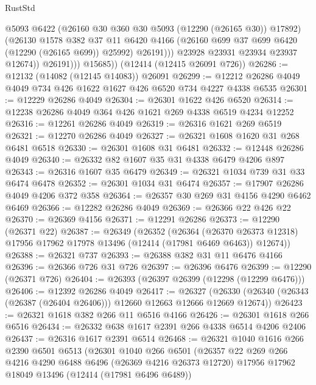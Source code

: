 \begin{lexlean}{RustStd}
\begin{coremodule}
                      @5093
                      @6422
                      (@26160 @30 @360 @30 @5093 (@12290 (@26165 @30)) @17892)
                      (@26130
                        @1578
                        @382
                        @37
                        @11
                        @6420
                        @4166
                        (@26160 @699 @37 @699 @6420 (@12290 (@26165 @699)) @25992)
                        @26191)))
                  @23928
                  @23931
                  @23934
                  @23937
                  @12674))
              @26191)))
        @15685))
    (@12414 (@12415 @26091 @726))
@26286 := @12132 (@14082 (@12145 @14083)) @26091
@26299 := @12212 @26286 @4049 @4049 @734 @426 @1622 @1627 @426 @6520 @734 @4227 @4338 @6535
@26301 := @12229 @26286 @4049
@26304 := @26301 @1622 @426 @6520
@26314 := @12238 @26286 @4049 @364 @426 @1621 @269 @4338 @6519 @4234 @12252
@26316 := @12261 @26286 @4049
@26319 := @26316 @1621 @269 @6519
@26321 := @12270 @26286 @4049
@26327 := @26321 @1608 @1620 @31 @268 @6481 @6518
@26330 := @26301 @1608 @31 @6481
@26332 := @12448 @26286 @4049
@26340 := @26332 @82 @1607 @35 @31 @4338 @6479 @4206 @897
@26343 := @26316 @1607 @35 @6479
@26349 := @26321 @1034 @739 @31 @33 @6474 @6478
@26352 := @26301 @1034 @31 @6474
@26357 := @17907 @26286 @4049 @4206 @372 @358
@26364 := @26357 @30 @269 @31 @4156 @4290 @6462 @6469
@26366 := @12282 @26286 @4049
@26369 := @26366 @22 @426 @22
@26370 := @26369 @4156
@26371 := @12291 @26286
@26373 := @12290 (@26371 @22)
@26387 := @26349
    (@26352
      (@26364
        (@26370 @26373 @12318)
        @17956
        @17962
        @17978
        @13496
        (@12414 (@17981 @6469 @6463))
        @12674))
@26388 := @26321 @737
@26393 := @26388 @382 @31 @11 @6476 @4166
@26396 := @26366 @726 @31 @726
@26397 := @26396 @6476
@26399 := @12290 (@26371 @726)
@26404 := @26393 (@26397 @26399 (@12298 (@12299 @6476)))
@26406 := @12392 @26286 @4049
@26417 := @26327
    (@26330 (@26340 (@26343 (@26387 (@26404 @26406))) @12660 @12663 @12666 @12669 @12674))
@26423 := @26321 @1618 @382 @266 @11 @6516 @4166
@26426 := @26301 @1618 @266 @6516
@26434 := @26332 @638 @1617 @2391 @266 @4338 @6514 @4206 @2406
@26437 := @26316 @1617 @2391 @6514
@26468 := @26321
    @1040
    @1616
    @266
    @2390
    @6501
    @6513
    (@26301
      @1040
      @266
      @6501
      (@26357
        @22
        @269
        @266
        @4216
        @4290
        @6488
        @6496
        (@26369 @4216 @26373 @12720)
        @17956
        @17962
        @18049
        @13496
        (@12414 (@17981 @6496 @6489))

\end{coremodule}
\end{lexlean}
